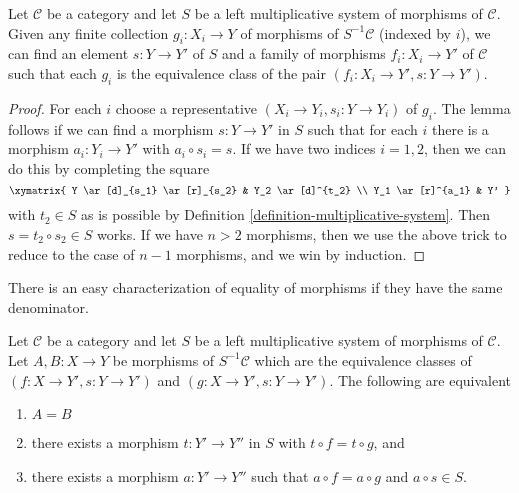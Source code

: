 \begin{lemma}
\label{lemma-morphisms-left-localization}
Let $\mathcal{C}$ be a category and let $S$ be a left multiplicative
system of morphisms of $\mathcal{C}$. Given any finite collection
$g_i : X_i \to Y$ of morphisms of $S^{-1}\mathcal{C}$
(indexed by $i$),
we can find an element $s : Y \to Y'$ of $S$ and
a family of morphisms $f_i : X_i \to Y'$ of $\mathcal{C}$ such that
each $g_i$ is the equivalence class of the pair
$(f_i : X_i \to Y', s : Y \to Y')$.
\end{lemma}

\begin{proof}
For each $i$ choose a representative $(X_i \to Y_i, s_i : Y \to Y_i)$
of $g_i$.
The lemma follows if we can find a morphism $s : Y \to Y'$ in $S$ such that
for each $i$ there is a morphism $a_i : Y_i \to Y'$ with
$a_i \circ s_i = s$. If we have two indices $i = 1, 2$, then we can
do this by completing the square
$$
\xymatrix{
Y \ar[d]_{s_1} \ar[r]_{s_2} & Y_2 \ar[d]^{t_2} \\
Y_1 \ar[r]^{a_1} & Y'
}
$$
with $t_2 \in S$ as is possible by
Definition \ref{definition-multiplicative-system}.
Then $s = t_2 \circ s_2 \in S$ works.
If we have $n > 2$ morphisms, then we use the above trick to reduce
to the case of $n - 1$ morphisms, and we win by induction.
\end{proof}

\noindent
There is an easy characterization of equality of morphisms if they
have the same denominator.

\begin{lemma}
\label{lemma-equality-morphisms-left-localization}
Let $\mathcal{C}$ be a category and let $S$ be a left multiplicative
system of morphisms of $\mathcal{C}$. Let $A, B : X \to Y$ be morphisms
of $S^{-1}\mathcal{C}$ which are the equivalence classes of
$(f : X \to Y', s : Y \to Y')$ and $(g : X \to Y', s : Y \to Y')$.
The following are equivalent
\begin{enumerate}
\item $A = B$
\item there exists a morphism $t : Y' \to Y''$
in $S$ with $t \circ f = t \circ g$, and
\item there exists a morphism $a : Y' \to Y''$
such that $a \circ f = a \circ g$ and $a \circ s \in S$.
\end{enumerate}
\end{lemma}

